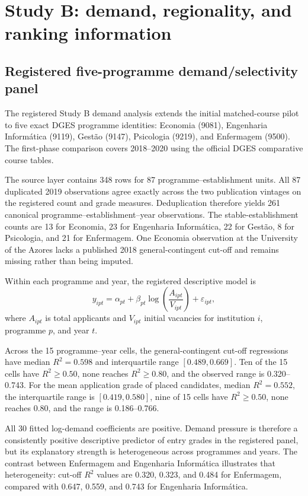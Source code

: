 \section{Study B: demand, regionality, and ranking information}

\subsection{Registered five-programme demand/selectivity panel}

The registered Study B demand analysis extends the initial matched-course pilot to five exact DGES programme identities: Economia (9081), Engenharia Informática (9119), Gestão (9147), Psicologia (9219), and Enfermagem (9500). The first-phase comparison covers 2018--2020 using the official DGES comparative course tables.

The source layer contains 348 rows for 87 programme--establishment units. All 87 duplicated 2019 observations agree exactly across the two publication vintages on the registered count and grade measures. Deduplication therefore yields 261 canonical programme--establishment--year observations. The stable-establishment counts are 13 for Economia, 23 for Engenharia Informática, 22 for Gestão, 8 for Psicologia, and 21 for Enfermagem. One Economia observation at the University of the Azores lacks a published 2018 general-contingent cut-off and remains missing rather than being imputed.

Within each programme and year, the registered descriptive model is
\[
y_{ipt}=\alpha_{pt}+\beta_{pt}\log\left(\frac{A_{ipt}}{V_{ipt}}\right)+\varepsilon_{ipt},
\]
where $A_{ipt}$ is total applicants and $V_{ipt}$ initial vacancies for institution $i$, programme $p$, and year $t$.

Across the 15 programme--year cells, the general-contingent cut-off regressions have median $R^2=0.598$ and interquartile range $[0.489,0.669]$. Ten of the 15 cells have $R^2\geq0.50$, none reaches $R^2\geq0.80$, and the observed range is 0.320--0.743. For the mean application grade of placed candidates, median $R^2=0.552$, the interquartile range is $[0.419,0.580]$, nine of 15 cells have $R^2\geq0.50$, none reaches 0.80, and the range is 0.186--0.766.

All 30 fitted log-demand coefficients are positive. Demand pressure is therefore a consistently positive descriptive predictor of entry grades in the registered panel, but its explanatory strength is heterogeneous across programmes and years. The contrast between Enfermagem and Engenharia Informática illustrates that heterogeneity: cut-off $R^2$ values are 0.320, 0.323, and 0.484 for Enfermagem, compared with 0.647, 0.559, and 0.743 for Engenharia Informática.

